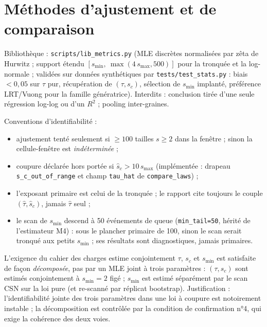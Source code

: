 \documentclass[11pt,a4paper]{article}
\newcommand{\code}[1]{\texttt{#1}}
\begin{document}
\section{Méthodes d'ajustement et de comparaison}

Bibliothèque : \code{scripts/lib\_metrics.py} (MLE discrètes normalisées
par zêta de Hurwitz ; support étendu $[s_{\min},\ \max(4\,s_{\max},500)]$
pour la tronquée et la log-normale ; validées sur données synthétiques par
\code{tests/test\_stats.py} : biais $<0{,}05$ sur $\tau$ pur, récupération
de $(\tau,s_c)$, sélection de $s_{\min}$ implanté, préférence LRT/Vuong
pour la famille génératrice). Interdits : conclusion tirée d'une seule
régression log-log ou d'un $R^2$ ; pooling inter-graines.

Conventions d'identifiabilité :
\begin{itemize}
\item ajustement tenté seulement si $\ge100$ tailles $s\ge2$ dans la
fenêtre ; sinon la cellule-fenêtre est \emph{indéterminée} ;
\item coupure déclarée \og hors portée \fg{} si $\hat s_c>10\,s_{\max}$
(implémentée : drapeau \code{s\_c\_out\_of\_range} et champ
\code{tau\_hat} de \code{compare\_laws}) ;
\item l'exposant primaire est celui de la tronquée ; le rapport cite
toujours le couple $(\hat\tau,\hat s_c)$, jamais $\hat\tau$ seul ;
\item le scan de $s_{\min}$ descend à 50 événements de queue
(\code{min\_tail=50}, hérité de l'estimateur M4) : sous le plancher
primaire de 100, sinon le scan serait tronqué aux petits $s_{\min}$ ; ses
résultats sont diagnostiques, jamais primaires.
\end{itemize}

L'exigence du cahier des charges \og estime conjointement $\tau$, $s_c$
et $s_{\min}$ \fg{} est satisfaite de façon \emph{décomposée}, pas par un
MLE joint à trois paramètres : $(\tau,s_c)$ sont estimés conjointement à
$s_{\min}=2$ figé ; $s_{\min}$ est estimé séparément par le scan CSN sur
la loi pure (et re-scanné par réplicat bootstrap). Justification :
l'identifiabilité jointe des trois paramètres dans une loi à coupure est
notoirement instable ; la décomposition est contrôlée par la condition de
confirmation n°4, qui exige la cohérence des deux voies.
\end{document}
